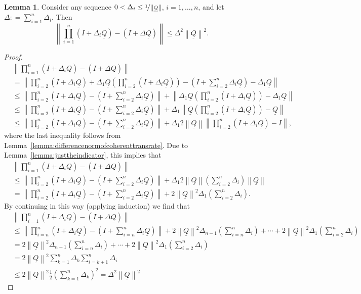\documentclass[10pt]{paper}
\theoremstyle{definition}
\newtheorem{lemma}[theorem]{Lemma}
\newcommand{\lrate}{\underline{Q}}
\newcommand{\norm}[1]{\left\lVert #1 \right\rVert}
\newcommand{\coloneqq}{:\!=}
\begin{document}
\begin{lemma}\label{lemma:justthelinearpart}
Consider any sequence $0<\Delta_i\leq\nicefrac{1}{\norm{\lrate}}$, $i=1,\dots,n$, and let $\Delta\coloneqq\sum_{i=1}^n\Delta_i$. Then
\begin{equation*}
\norm{\prod_{i=1}^n(I+\Delta_i\lrate)-(I+\Delta\lrate)}\leq\Delta^2\norm{\lrate}^2.
\end{equation*}
\end{lemma}
\begin{proof}
\begin{align*}
&\norm{\prod_{i=1}^n(I+\Delta_i\lrate)-(I+\Delta\lrate)}\\
&=\norm{\prod_{i=2}^n(I+\Delta_i\lrate)+\Delta_1\lrate\left(\prod_{i=2}^n(I+\Delta_i\lrate)\right)-(I+\sum_{i=2}^n\Delta_i\lrate)-\Delta_1\lrate}\\
&\leq\norm{\prod_{i=2}^n(I+\Delta_i\lrate)-(I+\sum_{i=2}^n\Delta_i\lrate)}+\norm{\Delta_1\lrate\left(\prod_{i=2}^n(I+\Delta_i\lrate)\right)-\Delta_1\lrate}\\
&\leq\norm{\prod_{i=2}^n(I+\Delta_i\lrate)-(I+\sum_{i=2}^n\Delta_i\lrate)}+\Delta_1\norm{\lrate\left(\prod_{i=2}^n(I+\Delta_i\lrate)\right)-\lrate}\\
&\leq\norm{\prod_{i=2}^n(I+\Delta_i\lrate)-(I+\sum_{i=2}^n\Delta_i\lrate)}+\Delta_1 2\norm{\lrate}\norm{\prod_{i=2}^n(I+\Delta_i\lrate)-I},
\end{align*}
where the last inequality follows from Lemma~\ref{lemma:differencenormofcoherenttransrate}. Due to Lemma~\ref{lemma:justtheindicator}, this implies that
\begin{align*}
&\norm{\prod_{i=1}^n(I+\Delta_i\lrate)-(I+\Delta\lrate)}\\
&\leq\norm{\prod_{i=2}^n(I+\Delta_i\lrate)-(I+\sum_{i=2}^n\Delta_i\lrate)}+\Delta_1 2\norm{\lrate}\left(\sum_{i=2}^n\Delta_i\right)\norm{\lrate}\\
&=\norm{\prod_{i=2}^n(I+\Delta_i\lrate)-(I+\sum_{i=2}^n\Delta_i\lrate)}+2\norm{\lrate}^2\Delta_1\left(\sum_{i=2}^n\Delta_i\right).
\end{align*}
By continuing in this way (applying induction) we find that
\begin{align*}
&\norm{\prod_{i=1}^n(I+\Delta_i\lrate)-(I+\Delta\lrate)}\\
&\leq
\norm{\prod_{i=n}^n(I+\Delta_i\lrate)-(I+\sum_{i=n}^n\Delta_i\lrate)}
+2\norm{\lrate}^2\Delta_{n-1}\left(\sum_{i=n}^n\Delta_i\right)
+\cdots
+2\norm{\lrate}^2\Delta_1\left(\sum_{i=2}^n\Delta_i\right)\\
&=2\norm{\lrate}^2\Delta_{n-1}\left(\sum_{i=n}^n\Delta_i\right)
+\cdots
+2\norm{\lrate}^2\Delta_1\left(\sum_{i=2}^n\Delta_i\right)\\
&=2\norm{\lrate}^2\sum_{k=1}^n\Delta_k\sum_{i=k+1}^n\Delta_i\\
&\leq2\norm{\lrate}^2\frac{1}{2}\left(\sum_{k=1}^n\Delta_k\right)^2=\Delta^2\norm{\lrate}^2
\end{align*}
\end{proof}
\end{document}
